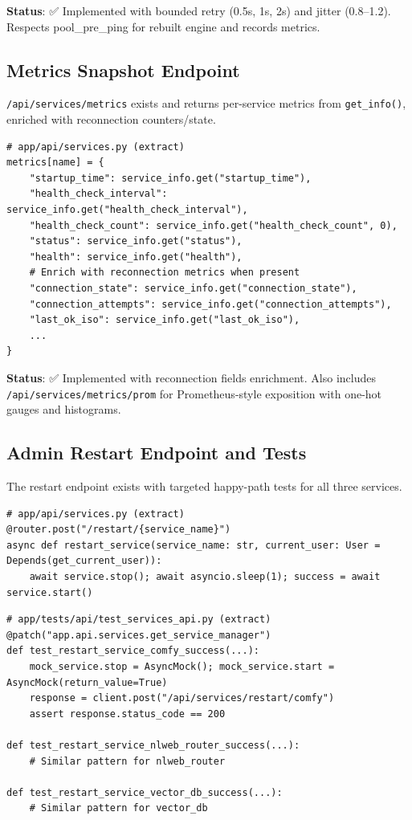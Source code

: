 \documentclass[11pt]{article}
\begin{document}
\textbf{Status}: ✅ Implemented with bounded retry (0.5s, 1s, 2s) and jitter (0.8–1.2). Respects pool\_pre\_ping for rebuilt engine and records metrics.

\subsection{Metrics Snapshot Endpoint}
\texttt{/api/services/metrics} exists and returns per-service metrics from \texttt{get\_info()}, enriched with reconnection counters/state.

\begin{verbatim}
# app/api/services.py (extract)
metrics[name] = {
    "startup_time": service_info.get("startup_time"),
    "health_check_interval": service_info.get("health_check_interval"),
    "health_check_count": service_info.get("health_check_count", 0),
    "status": service_info.get("status"),
    "health": service_info.get("health"),
    # Enrich with reconnection metrics when present
    "connection_state": service_info.get("connection_state"),
    "connection_attempts": service_info.get("connection_attempts"),
    "last_ok_iso": service_info.get("last_ok_iso"),
    ...
}
\end{verbatim}

\textbf{Status}: ✅ Implemented with reconnection fields enrichment. Also includes \texttt{/api/services/metrics/prom} for Prometheus-style exposition with one-hot gauges and histograms.

\subsection{Admin Restart Endpoint and Tests}
The restart endpoint exists with targeted happy-path tests for all three services.

\begin{verbatim}
# app/api/services.py (extract)
@router.post("/restart/{service_name}")
async def restart_service(service_name: str, current_user: User = Depends(get_current_user)):
    await service.stop(); await asyncio.sleep(1); success = await service.start()
\end{verbatim}

\begin{verbatim}
# app/tests/api/test_services_api.py (extract)
@patch("app.api.services.get_service_manager")
def test_restart_service_comfy_success(...):
    mock_service.stop = AsyncMock(); mock_service.start = AsyncMock(return_value=True)
    response = client.post("/api/services/restart/comfy")
    assert response.status_code == 200

def test_restart_service_nlweb_router_success(...):
    # Similar pattern for nlweb_router

def test_restart_service_vector_db_success(...):
    # Similar pattern for vector_db
\end{verbatim}
\end{document}
